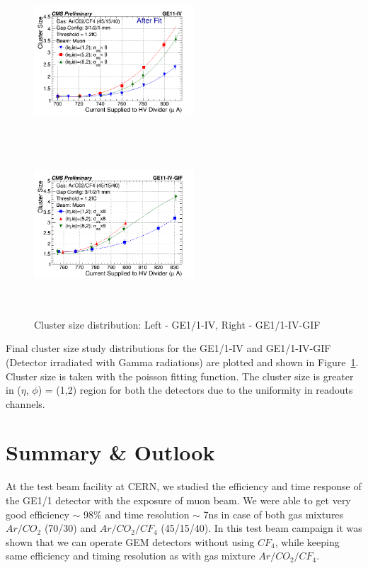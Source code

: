 \begin{figure}[!htbp]
   \begin{center}
     \includegraphics[width=6cm,height=6cm]{figures/GEM/CurrentvsClusterSizeAll3EtaPhi.png}
     \includegraphics[width=6cm,height=6cm]{figures/GEM/CurrentvsClusterSizeAll3EtaPhiGE11IVGIF.png}
   \end{center}
   \caption{Cluster size distribution: Left - GE1/1-IV, Right - GE1/1-IV-GIF}
   \label{fig:CSDGE1/1}
 \end{figure}

 Final cluster size study distributions for the GE1/1-IV and GE1/1-IV-GIF (Detector irradiated with Gamma radiations) are plotted and shown in Figure~\ref{fig:CSDGE1/1}. Cluster size is taken with the poisson fitting function. The cluster size is greater in ($\eta$, $\phi$) = (1,2) region for both the detectors due to the uniformity in readouts channels.




% 



\section{Summary \& Outlook}
At the test beam facility at CERN, we studied the efficiency and time response of the GE1/1 detector with the exposure of muon beam. We were able to get very good efficiency $\sim$ 98\% and time resolution $\sim$ 7ns in case of both gas mixtures $Ar/CO_2$ (70/30) and $Ar/CO_2/CF_4$ (45/15/40). In this test beam campaign it was shown that we can operate GEM detectors without using $CF_4$, while keeping same efficiency and timing resolution as with gas mixture $Ar/CO_2/CF_4$.


